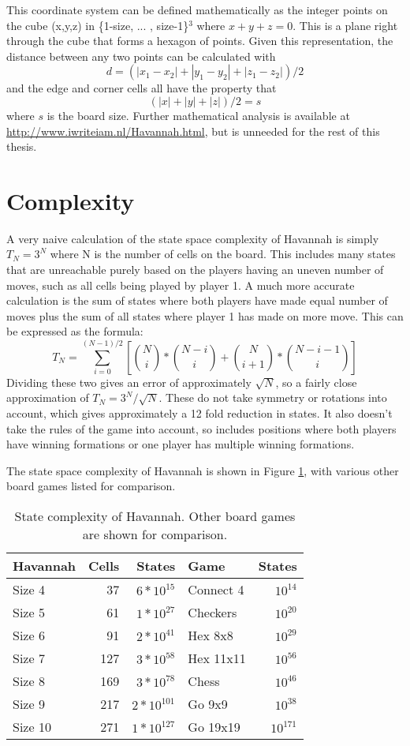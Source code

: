 This coordinate system can be defined mathematically as the integer points on the cube (x,y,z) in \{1-size, ... , size-1\}$^3$ where $x + y + z = 0$. This is a plane right through the cube that forms a hexagon of points. Given this representation, the distance between any two points can be calculated with
$$d = (|x_1-x_2| + |y_1-y_2| + |z_1-z_2|)/2$$
and the edge and corner cells all have the property that
$$(|x| + |y| + |z|)/2 = s$$
where $s$ is the board size. Further mathematical analysis is available at \url{http://www.iwriteiam.nl/Havannah.html}, but is unneeded for the rest of this thesis.



\section{Complexity}

A very naive calculation of the state space complexity of Havannah is simply $T_N = 3^N$ where N is the number of cells on the board. This includes many states that are unreachable purely based on the players having an uneven number of moves, such as all cells being played by player 1. A much more accurate calculation is the sum of states where both players have made equal number of moves plus the sum of all states where player 1 has  made on more move. This can be expressed as the formula:
$$T_N = \sum_{i = 0}^{(N-1)/2} [ {N \choose i}*{N-i \choose i} + {N \choose i + 1}*{N - i - 1 \choose i}]$$
Dividing these two gives an error of approximately $\sqrt{N}$, so a fairly close approximation of $T_N = 3^N/\sqrt{N}$. These do not take symmetry or rotations into account, which gives approximately a 12 fold reduction in states. It also doesn't take the rules of the game into account, so includes positions where both players have winning formations or one player has multiple winning formations.

The state space complexity of Havannah is shown in Figure \ref{table:complexity}, with various other board games listed for comparison.

\begin{table}
  \centering
\begin{tabular}{lrr|lr}
Havannah & Cells & States       & Game      & States \\ \hline
Size 4   &    37 & $6*10^{15}$  & Connect 4 & $10^{14}$ \\
Size 5   &    61 & $1*10^{27}$  & Checkers  & $10^{20}$ \\
Size 6   &    91 & $2*10^{41}$  & Hex 8x8   & $10^{29}$ \\
Size 7   &   127 & $3*10^{58}$  & Hex 11x11 & $10^{56}$ \\
Size 8   &   169 & $3*10^{78}$  & Chess     & $10^{46}$ \\
Size 9   &   217 & $2*10^{101}$ & Go 9x9    & $10^{38}$ \\
Size 10  &   271 & $1*10^{127}$ & Go 19x19  & $10^{171}$\\

\end{tabular}
	\caption{State complexity of Havannah. Other board games are shown for comparison.}
	\label{table:complexity}
\end{table}

